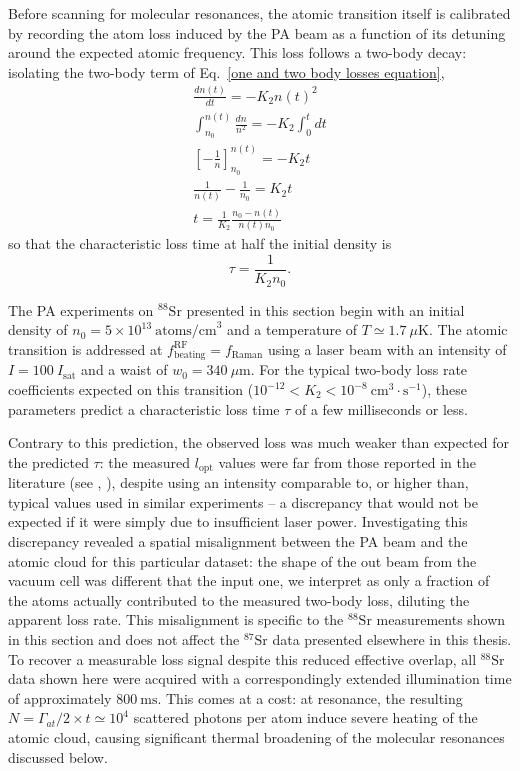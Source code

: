 Before scanning for molecular resonances, the atomic transition itself is calibrated by
recording the atom loss induced by the PA beam as a function of its detuning around the
expected atomic frequency. This loss follows a two-body decay: isolating the two-body
term of Eq.~\ref{one and two body losses equation},
\begin{gather*}
\frac{dn(t)}{dt} = -K_2 n(t)^2 \\
\int_{n_0}^{n(t)} \frac{dn}{n^2} = -K_2 \int_{0}^{t} dt \\
    \left[ -\frac{1}{n} \right]_{n_0}^{n(t)} = -K_2 t \\
\frac{1}{n(t)} - \frac{1}{n_0} = K_2 t \\
    t = \frac{1}{K_2} \frac{n_0 - n(t)}{n(t) n_0}
\end{gather*}
so that the characteristic loss time at half the initial density is
\begin{equation}
\tau = \frac{1}{K_2 n_0}.
\label{temps caractéristique}
\end{equation}

The PA experiments on $^{88}\text{Sr}$ presented in this section begin with an initial
density of $n_0 = 5 \times 10^{13}~\text{atoms/cm}^3$ and a temperature of
$T \simeq 1.7~\mu\text{K}$. The atomic transition is addressed at
$f^{\text{RF}}_{\text{beating}} = f_{\text{Raman}}$ using a laser beam with an intensity
of $I = 100~I_{\text{sat}}$ and a waist of $w_0 = 340~\mu\text{m}$. For the typical
two-body loss rate coefficients expected on this transition
($10^{-12} < K_2 < 10^{-8}~\text{cm}^3\cdot\text{s}^{-1}$), 
these parameters predict a
characteristic loss time $\tau$ of a few milliseconds or less.

Contrary to this prediction, the observed loss was
much weaker than expected for the predicted $\tau$: the measured $l_{\text{opt}}$ values
were far from those reported in the literature (see \cite{reschovsky_narrow-line_2018}, \cite{yan_controlling_2013}), despite using an intensity comparable
to, or higher than, typical values used in similar experiments -- a discrepancy that
would not be expected if it were simply due to insufficient laser power. Investigating
this discrepancy revealed a spatial misalignment between the PA beam and the atomic
cloud for this particular dataset: the shape of the out beam from the vacuum cell was 
different that the input one, we interpret as only a fraction of the atoms actually contributed to the
measured two-body loss, diluting the apparent loss rate. This misalignment is specific
to the $^{88}\text{Sr}$ measurements shown in this section and does not affect the
$^{87}\text{Sr}$ data presented elsewhere in this thesis. To recover a measurable loss
signal despite this reduced effective overlap, all $^{88}\text{Sr}$ data shown here were
acquired with a correspondingly extended illumination time of approximately
$800~\text{ms}$.
This comes at a cost: at resonance, the resulting $N = \Gamma_{at}/2 \times t \simeq 10^4$
scattered photons per atom induce severe heating of the atomic cloud, causing significant
thermal broadening of the molecular resonances discussed below.

